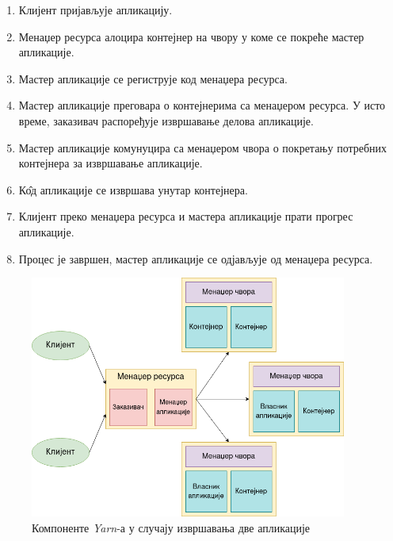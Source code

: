 \documentclass[12pt,oneside]{memoir}
\begin{document}
\begin{enumerate}
	\item Клијент пријављује апликацију.
	\item Менаџер ресурса алоцира контејнер на чвору у коме се покреће мастер апликације.
	\item Мастер апликације се региструје код менаџера ресурса.
	\item Мастер апликације преговара о контејнерима са менаџером ресурса. У исто време, заказивач распоређује извршавање делова апликације.
	\item Мастер апликације комунуцира са менаџером чвора о покретању потребних контејнера за извршавање апликације.
	\item К\^{о}д апликације се извршава унутар контејнера.
	\item Клијент преко менаџера ресурса и мастера апликације прати прогрес апликације.
	\item Процес је завршен, мастер апликације се одјављује од менаџера ресурса.
\end{enumerate}

\begin{figure}[!ht]
  \centering
  \includegraphics[width=0.93\textwidth]{pictures/yarn_arch.png}
  \caption{Компоненте \textit{Yarn}-а у случају извршавања две апликације}
  \label{fig:yarn_ar}
\end{figure}
\end{document}
